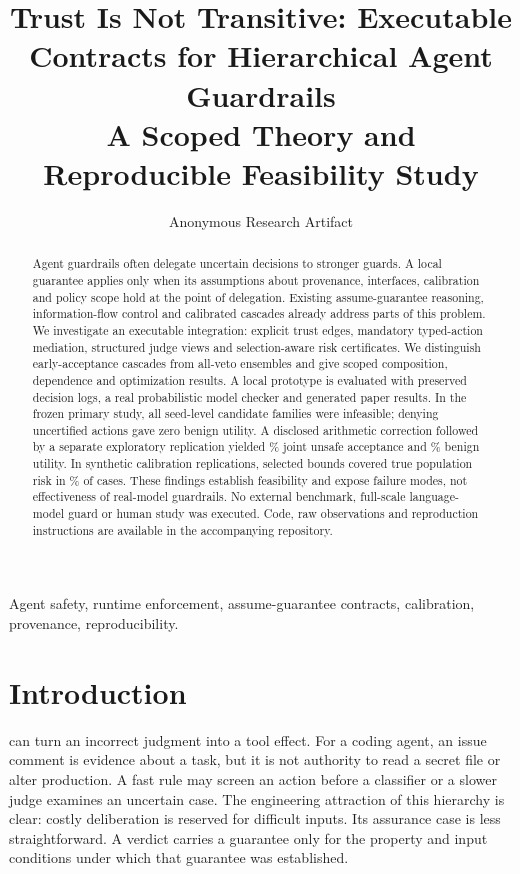 \documentclass[lettersize,journal]{IEEEtran}
\begin{document}
\title{Trust Is Not Transitive: Executable Contracts for Hierarchical Agent Guardrails\\A Scoped Theory and Reproducible Feasibility Study}
\author{Anonymous Research Artifact}
\maketitle

\begin{abstract}
Agent guardrails often delegate uncertain decisions to stronger guards. A local
guarantee applies only when its assumptions about provenance, interfaces,
calibration and policy scope hold at the point of delegation. Existing
assume-guarantee reasoning, information-flow control and calibrated cascades
already address parts of this problem. We investigate an executable integration:
explicit trust edges, mandatory typed-action mediation, structured judge views
and selection-aware risk certificates. We distinguish early-acceptance cascades
from all-veto ensembles and give scoped composition, dependence and optimization
results. A local prototype is evaluated with preserved decision logs, a real
probabilistic model checker and generated paper results. In the frozen primary
study, all \resPrimaryInfeasible{} seed-level candidate families were infeasible;
denying uncertified actions gave zero benign utility. A disclosed arithmetic
correction followed by a separate exploratory replication yielded
\resExploratoryCheckedQuarantineRisk{}\% joint unsafe acceptance and
\resExploratoryCheckedQuarantineUtility{}\% benign utility. In
\resPrimaryReplications{} synthetic calibration replications, selected bounds
covered true population risk in \resPrimaryCoverage{}\% of cases. These findings
establish feasibility and expose failure modes, not effectiveness of real-model
guardrails. No external benchmark, full-scale language-model guard or human
study was executed. Code, raw observations and reproduction instructions are
available in the accompanying repository.
\end{abstract}
\begin{IEEEkeywords}
Agent safety, runtime enforcement, assume-guarantee contracts, calibration,
provenance, reproducibility.
\end{IEEEkeywords}

\section{Introduction}
 can turn an incorrect judgment into a tool effect.
For a coding agent, an issue comment is evidence about a task, but it is not
authority to read a secret file or alter production. A fast rule may screen an
action before a classifier or a slower judge examines an uncertain case. The
engineering attraction of this hierarchy is clear: costly deliberation is
reserved for difficult inputs. Its assurance case is less straightforward.
A verdict carries a guarantee only for the property and input conditions under
which that guarantee was established.
\end{document}
